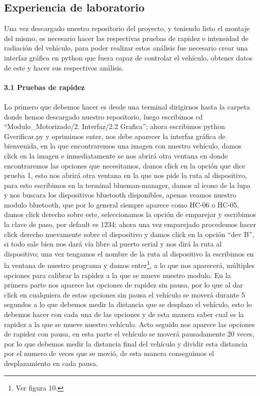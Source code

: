 \documentclass[12]{article}
\begin{document}
\begin{multicols}{2}
\section{Experiencia de laboratorio}

Una vez descargado nuestro repositorio del proyecto, y teniendo listo el montaje del mismo, es necesario hacer las respectivas pruebas de rapidez e intensidad de radiación del vehículo, para poder realizar estos análisis fue necesario crear una interfaz gráfica en python\cite{PYTHON} que fuera capaz de controlar el  vehículo, obtener datos de este y hacer sus respectivos análisis.\\\\
{\bf{3.1 Pruebas de rapidez}} \\\\
Lo primero que debemos hacer es desde una terminal dirigirnos hasta la carpeta donde hemos descargado nuestro repositorio, luego escribimos cd “Modulo\_Motorizado/2. Interfaz/2.2 Grafica”; ahora escribimos python Gverificar.py  y oprimimos enter, nos debe aparecer la interfaz gráfica de bienvenida, en la que encontraremos una imagen con nuestro vehículo, damos click en la imagen e inmediatamente se nos abrirá otra ventana en donde encontraremos las opciones que necesitamos, damos click en la opción que dice prueba 1, esto nos abrirá otra ventana en la que nos pide la ruta al dispositivo, para esto  escribimos en la terminal blueman-manager, damos al icono de la lupa y nos buscara los dispositivos bluetooth disponibles, apenas veamos nuestro modulo bluetooth, que por lo general siempre aparece como HC-06 o HC-05, damos click derecho sobre este, seleccionamos la opción de emparejar y escribimos la clave de paso, por default es 1234; ahora una vez emparejado procedemos hacer click derecho nuevamente sobre el dispositivo y damos click en la opción “dev B”, si todo sale bien nos dará vía libre al puerto serial y nos dirá la ruta al dispositivo; una vez tengamos el nombre de la ruta al dispositivo la escribimos en la ventana de nuestro programa y damos enter\footnote{Ver figura 10.}, a lo que nos aparecerá, múltiples opciones  para calibrar la rapidez a la que se mueve nuestro modulo. En la primera parte nos aparece las opciones de rapidez sin pausa, por lo que al dar click en cualquiera de estas opciones sin pausa el vehículo se moverá durante 5 segundos a lo que debemos medir la distancia que se desplazo el vehículo, esto lo debemos hacer con cada una de las opciones y de esta manera saber cual es la rapidez a la que se mueve nuestro vehículo. Acto seguido nos aparece las opciones de rapidez con pausa, en esta parte el vehículo se moverá pausadamente 20 veces, por lo que debemos medir la distancia final del vehículo y dividir esta distancia por el numero de veces que se movió, de esta manera conseguimos el desplazamiento en cada pausa. 



\end{multicols}
\end{document}
